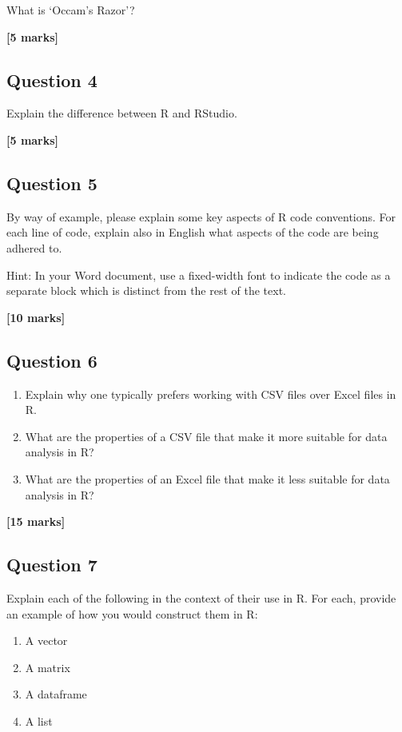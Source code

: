 \documentclass[
  10t,
]{article}
\providecommand{\tightlist}{%
  \setlength{\itemsep}{0pt}\setlength{\parskip}{0pt}}\usepackage{longtable,booktabs,array}
\begin{document}
What is `Occam's Razor'?

\textbf{{[}5 marks{]}}

\subsection{Question 4}\label{question-4}

Explain the difference between R and RStudio.

\textbf{{[}5 marks{]}}

\subsection{Question 5}\label{question-5}

By way of example, please explain some key aspects of R code
conventions. For each line of code, explain also in English what aspects
of the code are being adhered to.

{Hint: In your Word document, use a fixed-width font to indicate the
code as a separate block which is distinct from the rest of the text.}

\textbf{{[}10 marks{]}}

\subsection{Question 6}\label{question-6}

\begin{enumerate}
\def\labelenumi{\alph{enumi}.}
\tightlist
\item
  Explain why one typically prefers working with CSV files over Excel
  files in R.
\item
  What are the properties of a CSV file that make it more suitable for
  data analysis in R?
\item
  What are the properties of an Excel file that make it less suitable
  for data analysis in R?
\end{enumerate}

\textbf{{[}15 marks{]}}

\subsection{Question 7}\label{question-7}

Explain each of the following in the context of their use in R. For
each, provide an example of how you would construct them in R:

\begin{enumerate}
\def\labelenumi{\alph{enumi}.}
\tightlist
\item
  A vector
\item
  A matrix
\item
  A dataframe
\item
  A list
\end{enumerate}
\end{document}

